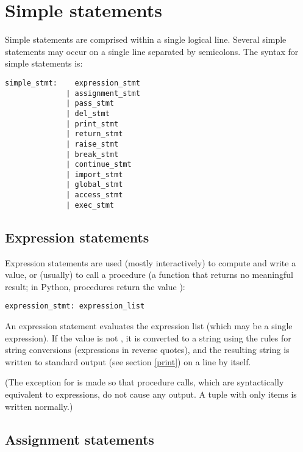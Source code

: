 \chapter{Simple statements}

Simple statements are comprised within a single logical line.
Several simple statements may occur on a single line separated
by semicolons.  The syntax for simple statements is:

\begin{verbatim}
simple_stmt:    expression_stmt
              | assignment_stmt
              | pass_stmt
              | del_stmt
              | print_stmt
              | return_stmt
              | raise_stmt
              | break_stmt
              | continue_stmt
              | import_stmt
              | global_stmt
              | access_stmt
              | exec_stmt
\end{verbatim}

\section{Expression statements}

Expression statements are used (mostly interactively) to compute and
write a value, or (usually) to call a procedure (a function that
returns no meaningful result; in Python, procedures return the value
\verb@None@):

\begin{verbatim}
expression_stmt: expression_list
\end{verbatim}

An expression statement evaluates the expression list (which may be a
single expression).  If the value is not \verb@None@, it is converted
to a string using the rules for string conversions (expressions in
reverse quotes), and the resulting string is written to standard
output (see section \ref{print}) on a line by itself.

(The exception for \verb@None@ is made so that procedure calls, which
are syntactically equivalent to expressions, do not cause any output.
A tuple with only \verb@None@ items is written normally.)

\section{Assignment statements}

